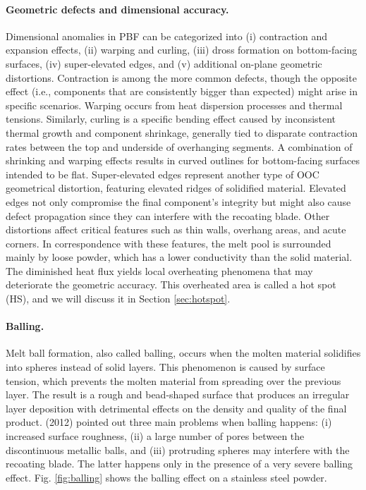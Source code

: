 \paragraph{Geometric defects and dimensional accuracy.} Dimensional anomalies in PBF can be categorized into (i) contraction and expansion effects, (ii) warping and curling, (iii) dross formation on bottom-facing surfaces, (iv) super-elevated edges, and (v) additional on-plane geometric distortions. Contraction is among the more common defects, though the opposite effect (i.e., components that are consistently bigger than expected) might arise in specific scenarios. Warping occurs from heat dispersion processes and thermal tensions. Similarly, curling is a specific bending effect caused by inconsistent thermal growth and component shrinkage, generally tied to disparate contraction rates between the top and underside of overhanging segments. A combination of shrinking and warping effects results in curved outlines for bottom-facing surfaces intended to be flat. Super-elevated edges represent another type of OOC geometrical distortion, featuring elevated ridges of solidified material. Elevated edges not only compromise the final component's integrity but might also cause defect propagation since they can interfere with the recoating blade. Other distortions affect critical features such as thin walls, overhang areas, and acute corners. In correspondence with these features, the melt pool is surrounded mainly by loose powder, which has a lower conductivity than the solid material. The diminished heat flux yields local overheating phenomena that may deteriorate the geometric accuracy. This overheated area is called a hot spot (HS), and we will discuss it in Section \ref{sec:hotspot}.
\paragraph{Balling.} Melt ball formation, also called balling, occurs when the molten material solidifies into spheres instead of solid layers. This phenomenon is caused by surface tension, which prevents the molten material from spreading over the previous layer. The result is a rough and bead-shaped surface that produces an irregular layer deposition with detrimental effects on the density and quality of the final product. \citeauthor{li_balling_2012}(2012) pointed out three main problems when balling happens: (i) increased surface roughness, (ii) a large number of pores between the discontinuous metallic balls, and (iii) protruding spheres may interfere with the recoating blade. The latter happens only in the presence of a very severe balling effect. Fig. \ref{fig:balling} shows the balling effect on a stainless steel powder.
